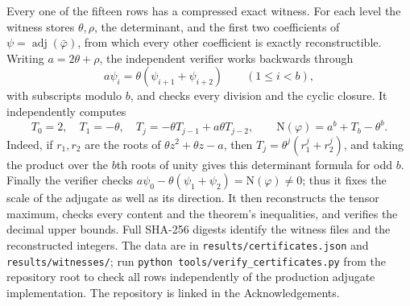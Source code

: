 \documentclass[12pt]{article}
\newcommand{\adj}{\operatorname{adj}}
\newcommand{\Nm}{\mathrm{N}}
\begin{document}
Every one of the fifteen rows has a compressed exact witness. For each level the witness stores $\theta,\rho$, the
determinant, and the first two coefficients of $\psi=\adj(\bar\varphi)$, from which every other coefficient is exactly
reconstructible. Writing $a=2\theta+\rho$, the independent verifier works backwards through
\[
a\psi_i=\theta(\psi_{i+1}+\psi_{i+2})\qquad(1\le i<b),
\]
with subscripts modulo $b$, and checks every division and the cyclic closure. It independently computes
\[
T_0=2,\quad T_1=-\theta,\quad T_j=-\theta T_{j-1}+a\theta T_{j-2},\qquad
\Nm(\varphi)=a^b+T_b-\theta^b.
\]
Indeed, if $r_1,r_2$ are the roots of $\theta z^2+\theta z-a$, then
$T_j=\theta^j(r_1^j+r_2^j)$, and taking the product over the $b$th roots of unity gives this determinant formula for
odd $b$. Finally the verifier checks $a\psi_0-\theta(\psi_1+\psi_2)=\Nm(\varphi)\ne0$; thus it fixes the scale of the
adjugate as well as its direction. It then reconstructs the tensor maximum, checks every content and the theorem's
inequalities, and verifies the decimal upper bounds. Full SHA-256 digests identify the witness files and the
reconstructed integers. The data are in \texttt{results/certificates.json} and \texttt{results/witnesses/}; run
\texttt{python tools/verify\_certificates.py} from the repository root to check all rows independently of the
production adjugate implementation. The repository is linked in the Acknowledgements.
\end{document}
